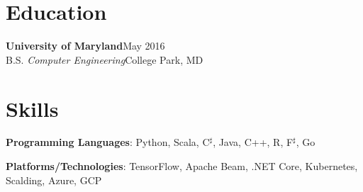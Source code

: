 \documentclass[letterpaper,11pt]{article}
\newcommand{\resentry}[6]{
\large{\sffamily\textbf{#1}}\hfill{\rmfamily\normalsize\textcolor{faded}{#2}} \\
\normalsize{#3}\hfill{\textcolor{faded}{\normalsize#4}}\\
\normalsize{#5}
\footnotesize{#6}
}
\newcommand{\resitem}[1]{\normalsize{\item #1}}
\begin{document}
\section*{Education}
\resentry{{University of Maryland}}{May 2016}{B.S. \emph{Computer Engineering}}{College Park, MD}{\vspace{-1em}}{}
\section*{Skills}
\begin{skillsitemize} 
\resitem{\textbf{Programming Languages}: Python, Scala, C$^\sharp$, Java, C++, R, F$^\sharp$, Go}
\resitem{\textbf{Platforms/Technologies}: TensorFlow, Apache Beam, .NET Core, Kubernetes, Scalding, Azure, GCP}
\end{skillsitemize}
\end{document}
